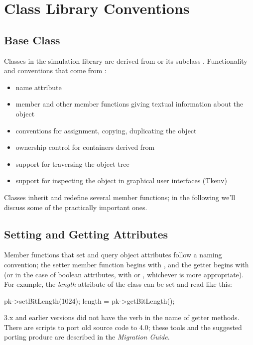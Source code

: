 \section{Class Library Conventions}

\subsection{Base Class}
\label{sec:ch-sim-lib:cobject}


Classes in the {\opp} simulation library are derived from 
or its subclass . Functionality and conventions that
come from :
\begin{itemize}
  \item{name attribute}
  \item{ member and other member functions giving textual
    information about the object}
  \item{conventions for assignment, copying, duplicating the object}
  \item{ownership control for containers derived from }
  \item{support for traversing the object tree}
  \item{support for inspecting the object in graphical user interfaces (Tkenv)}
\end{itemize}

Classes inherit and redefine several  member functions;
in the following we'll discuss some of the practically important
ones.


\subsection{Setting and Getting Attributes}

Member functions that set and query object attributes follow
a naming convention; the setter member function begins with
, and the getter begins with  (or in the case of
boolean attributes, with  or , whichever is more
appropriate). For example, the \textit{length} attribute of the
 class can be set and read like this:

\begin{cpp}
pk->setBitLength(1024);
length = pk->getBitLength();
\end{cpp}

\begin{note}
    {\opp} 3.x and earlier versions did not have the  verb
    in the name of getter methods. There are scripts to port old source
    code to {\opp} 4.0; these tools and the suggested porting produre
    are described in the \textit{Migration Guide}.
\end{note}

